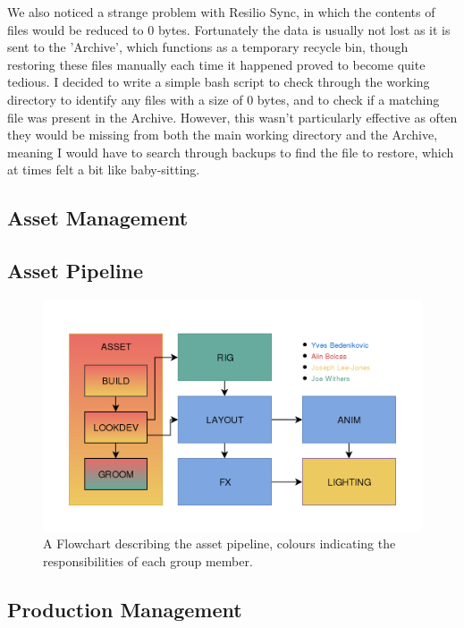 \documentclass[11pt]{article}
\begin{document}
We also noticed a strange problem with Resilio Sync, in which the contents of files would be reduced to 0 bytes. Fortunately the data is usually not lost as it is sent to the 'Archive', which functions as a temporary recycle bin, though restoring these files manually each time it happened proved to become quite tedious. I decided to write a simple bash script to check through the working directory to identify any files with a size of 0 bytes, and to check if a matching file was present in the Archive. However, this wasn't particularly effective as often they would be missing from both the main working directory and the Archive, meaning I would have to search through backups to find the file to restore, which at times felt a bit like baby-sitting.

\subsection{Asset Management}

\subsection{Asset Pipeline}

\begin{figure}[htbp]\centering
	\includegraphics[width=1.0\linewidth]{images/pipeline.png}
	\caption{\label{figure:pipelineFlow} A Flowchart describing the asset pipeline, colours indicating the responsibilities of each group member.}
\end{figure}

\subsection{Production Management}
\end{document}
